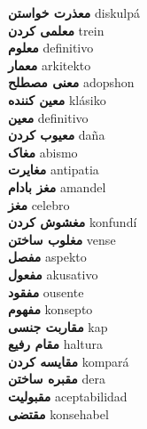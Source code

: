 \textbf{ معذرت خواستن  } diskulpá \\
\textbf{ معلمی کردن  } trein \\
\textbf{ معلوم  } definitivo \\
\textbf{ معمار  } arkitekto \\
\textbf{ معنی مصطلح  } adopshon \\
\textbf{ معین کننده  } klásiko \\
\textbf{ معین  } definitivo \\
\textbf{ معیوب کردن  } daña \\
\textbf{ مغاک  } abismo \\
\textbf{ مغایرت  } antipatia \\
\textbf{ مغز بادام  } amandel \\
\textbf{ مغز  } celebro \\
\textbf{ مغشوش کردن  } konfundí \\
\textbf{ مغلوب ساختن  } vense \\
\textbf{ مفصل  } aspekto \\
\textbf{ مفعول  } akusativo \\
\textbf{ مفقود  } ousente \\
\textbf{ مفهوم  } konsepto \\
\textbf{ مقاربت جنسی  } kap \\
\textbf{ مقام رفیع  } haltura \\
\textbf{ مقایسه کردن  } kompará \\
\textbf{ مقبره ساختن  } dera \\
\textbf{ مقبولیت  } aceptabilidad \\
\textbf{ مقتضی  } konsehabel \\
